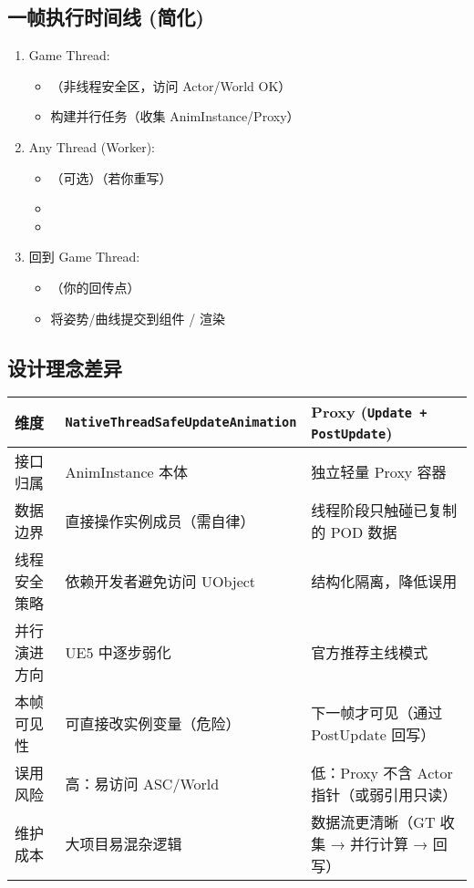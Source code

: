 \documentclass[10pt,openright,oneside,CJKmath]{MyBook}
\begin{document}
\subsection{一帧执行时间线 (简化)}
\begin{enumerate}[label=\arabic*.]
  \item Game Thread:
    \begin{itemize}
      \item {}（非线程安全区，访问 Actor/World OK）
      \item 构建并行任务（收集 AnimInstance/Proxy）
    \end{itemize}
  \item Any Thread (Worker):
    \begin{itemize}
      \item （可选）（若你重写）
      \item {}
      \item {}
    \end{itemize}
  \item 回到 Game Thread:
    \begin{itemize}
      \item {}（你的回传点）
      \item 将姿势/曲线提交到组件 / 渲染
    \end{itemize}
\end{enumerate}

\subsection{设计理念差异}
\begin{center}
\begin{tabular}{p{4cm} p{5.2cm} p{5.2cm}}
\hline
维度 & \texttt{NativeThreadSafeUpdateAnimation} & Proxy (\texttt{Update + PostUpdate}) \\
\hline
接口归属 & AnimInstance 本体 & 独立轻量 Proxy 容器 \\
数据边界 & 直接操作实例成员（需自律） & 线程阶段只触碰已复制的 POD 数据 \\
线程安全策略 & 依赖开发者避免访问 UObject & 结构化隔离，降低误用 \\
并行演进方向 & UE5 中逐步弱化 & 官方推荐主线模式 \\
本帧可见性 & 可直接改实例变量（危险） & 下一帧才可见（通过 PostUpdate 回写） \\
误用风险 & 高：易访问 ASC/World & 低：Proxy 不含 Actor 指针（或弱引用只读） \\
维护成本 & 大项目易混杂逻辑 & 数据流更清晰（GT 收集 → 并行计算 → 回写） \\
\hline
\end{tabular}
\end{center}
\end{document}
